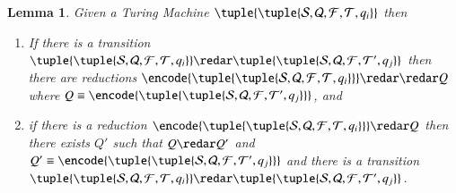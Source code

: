 \documentclass[submission,copyright,creativecommons]{eptcs}
\newtheorem{lemma}[theorem]{Lemma}
\newcommand{\tmach}[1]{\tuple{\tuple{#1}}}
\begin{document}
\begin{lemma}
\label{lem:reduction-pi}
Given a Turing Machine $\tmach{{\mathcal S}, {\mathcal Q}, {\mathcal F}, {\mathcal T}, q_i}$
then
\begin{enumerate}
\item If there is a transition
$\tmach{{\mathcal S}, {\mathcal Q}, {\mathcal F}, {\mathcal T}, q_i}\redar
\tmach{{\mathcal S}, {\mathcal Q}, {\mathcal F}, {\mathcal T}', q_j}$
then there are reductions
$\encode{\tmach{{\mathcal S}, {\mathcal Q}, {\mathcal F}, {\mathcal T}, q_i}}\redar\redar Q$
where $Q\equiv\encode{\tmach{{\mathcal S}, {\mathcal Q}, {\mathcal F}, {\mathcal T}', q_j}}$, and
\item if there is a reduction
$\encode{\tmach{{\mathcal S}, {\mathcal Q}, {\mathcal F}, {\mathcal T}, q_i}}\redar Q$
then there exists $Q'$ such that $Q\redar Q'$ and
$Q'\equiv\encode{\tmach{{\mathcal S}, {\mathcal Q}, {\mathcal F}, {\mathcal T}', q_j}}$ and
there is a transition
$\tmach{{\mathcal S}, {\mathcal Q}, {\mathcal F}, {\mathcal T}, q_i}\redar
\tmach{{\mathcal S}, {\mathcal Q}, {\mathcal F}, {\mathcal T}', q_j}$.
\end{enumerate}
\end{lemma}
\end{document}

